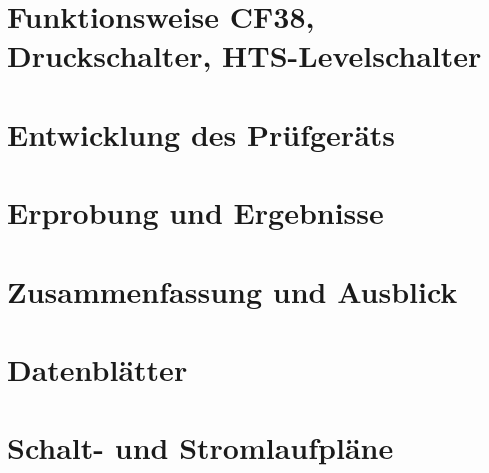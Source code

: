 \documentclass[12pt,a4paper,twoside]{report}
\begin{document}
\chapter{Funktionsweise CF38, Druckschalter, HTS-Levelschalter}


\chapter{Entwicklung des Prüfgeräts}


\chapter{Erprobung und Ergebnisse}


\chapter{Zusammenfassung und Ausblick}

\printbibliography

\appendix

\chapter{Datenblätter}
\newpage

\chapter{Schalt- und Stromlaufpläne}
\end{document}

